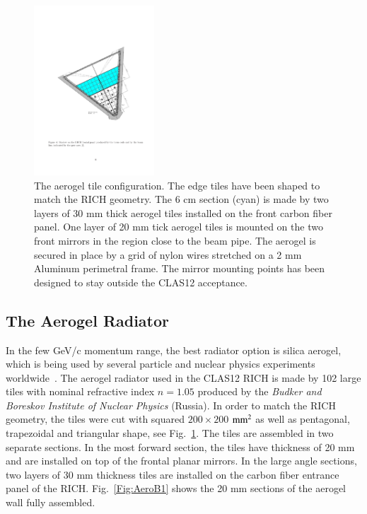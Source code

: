\documentclass[final,5p,times,twocolumn]{elsarticle}
\begin{document}
\begin{figure}
\begin{center}
\includegraphics[width=0.40\textwidth]{EPS/Design_aerogel.pdf}
\caption{The aerogel tile configuration. The edge tiles have been shaped to match the RICH geometry. 
The 6 cm section (cyan) is made by two layers of 30 mm thick aerogel tiles installed on the front carbon fiber panel.
One layer of 20 mm tick aerogel tiles is mounted on the two front mirrors in the region close to the beam pipe. The 
aerogel is secured in place by a grid of nylon wires stretched on a 2 mm Aluminum perimetral frame.   
The mirror mounting points has been designed to stay outside the CLAS12 acceptance.}
\label{fig:RICHaero}
\end{center}
\end{figure}


\subsection{The Aerogel Radiator}

In the few GeV/c momentum range, the best radiator option is silica aerogel, which is being used by several particle and nuclear 
physics experiments worldwide~\cite{REF:Aerogel,REF:Belle}. The aerogel radiator used in the CLAS12 RICH is made by 102 large tiles 
with nominal refractive index $n=1.05$ produced by the {\it Budker and Boreskov Institute of Nuclear Physics} (Russia). In order to 
match the RICH geometry, the tiles were cut with squared $200 \times 200$ $\rm mm^2$ as well as pentagonal, trapezoidal and triangular shape,
see Fig.~\ref{fig:RICHaero}.  
The tiles are assembled in two separate sections. In the most forward section, the tiles have thickness of 20 mm and are installed on 
top of the frontal planar mirrors.  In the large angle sections, two layers of 30 mm thickness tiles are installed on the carbon fiber 
entrance panel of the RICH. Fig.~\ref{Fig:AeroB1} shows the 20 mm sections of the aerogel wall fully assembled.
\end{document}
